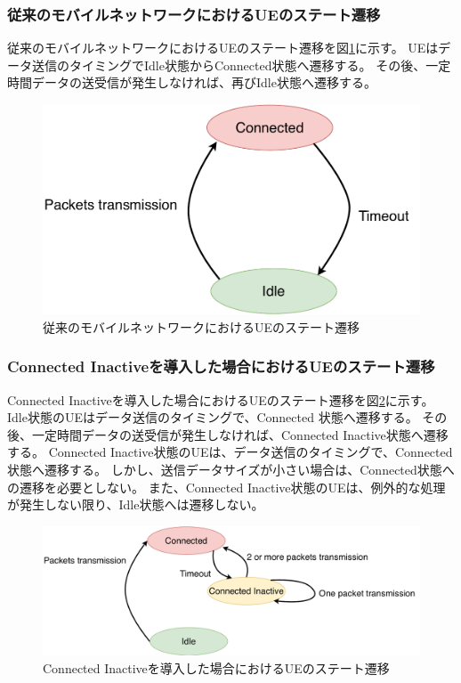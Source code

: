 \documentclass[a4j]{ujarticle}
\begin{document}
    \subsubsection{従来のモバイルネットワークにおけるUEのステート遷移}
    従来のモバイルネットワークにおけるUEのステート遷移を図\ref{state_change_old}に示す。
    UEはデータ送信のタイミングでIdle状態からConnected状態へ遷移する。
    その後、一定時間データの送受信が発生しなければ、再びIdle状態へ遷移する。
    \begin{figure}[htbp]
      \centering
      \includegraphics[width=0.7\hsize]{state_change_old.pdf}
      \caption{従来のモバイルネットワークにおけるUEのステート遷移}
      \label{state_change_old}
    \end{figure}
    \subsubsection{Connected Inactiveを導入した場合におけるUEのステート遷移}
    Connected Inactiveを導入した場合におけるUEのステート遷移を図\ref{state_change_inactive}に示す。
    Idle状態のUEはデータ送信のタイミングで、Connected 状態へ遷移する。
    その後、一定時間データの送受信が発生しなければ、Connected Inactive状態へ遷移する。
    Connected Inactive状態のUEは、データ送信のタイミングで、Connected 状態へ遷移する。
    しかし、送信データサイズが小さい場合は、Connected状態への遷移を必要としない。
    また、Connected Inactive状態のUEは、例外的な処理が発生しない限り、Idle状態へは遷移しない。
    \begin{figure}[htbp]
      \centering
      \includegraphics[width=1.0\hsize]{state_change_inactive.pdf}
      \caption{Connected Inactiveを導入した場合におけるUEのステート遷移}
      \label{state_change_inactive}
    \end{figure}
\end{document}
